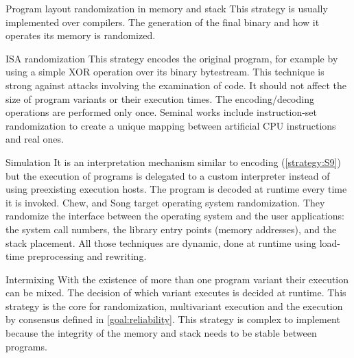 \begin{strategy}{Program layout randomization in memory and stack}
    \label{strategy:S7}
    \normalfont
    This strategy is usually implemented over compilers. The generation of the final binary and how it operates its memory is randomized.  %
\end{strategy}


\begin{strategy}{ISA randomization}
    \label{strategy:S8}
    \normalfont
    This strategy encodes the original program, for example by using a simple XOR operation over its binary bytestream. This technique is strong against attacks involving the examination of code. It should not affect the size of program variants or their execution times. The encoding/decoding operations are performed only once. 
    Seminal works include instruction-set randomization \cite{Kc03,barrantes2003randomized}
    to create a unique mapping between artificial CPU instructions and real ones.
\end{strategy}


\begin{strategy}{Simulation}
    \label{strategy:S9}
    \normalfont
    It is an interpretation mechanism similar to encoding (\autoref{strategy:S9}) but the execution of programs is delegated to a custom interpreter instead of using preexisting execution hosts. The program is decoded at runtime every time it is invoked. 
    Chew, and Song \cite{Chew02mitigatingbuffer} target operating system randomization. They randomize the interface between the operating system and the user applications:
    the system call numbers, the library entry points (memory addresses), and the stack placement. All those techniques are dynamic, done at runtime using load-time preprocessing and rewriting. 
\end{strategy}


\begin{strategy}{Intermixing}
    \label{strategy:S10}
    \normalfont
    With the existence of more than one program variant their execution can be mixed. The decision of which variant executes is decided at runtime. This strategy is the core for randomization, multivariant execution and the execution by consensus defined in \autoref{goal:reliability}. This strategy is 
    complex to implement because the integrity of the memory and stack needs to be stable between programs.
\end{strategy}

